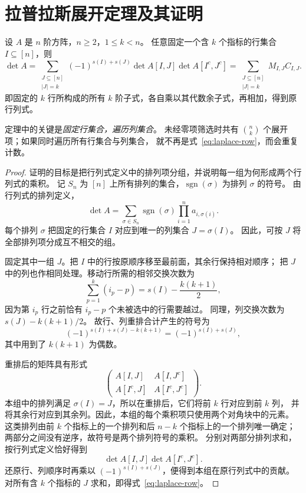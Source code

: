 \documentclass[UTF8,12pt,a4paper,fontset=fandol]{ctexart}
\begin{document}
\section{拉普拉斯展开定理及其证明}

\begin{theorem}[按固定的多行展开]
\label{thm:laplace-row}
设 $A$ 是 $n$ 阶方阵，$n\geq2$，$1\leq k<n$。
任意固定一个含 $k$ 个指标的行集合 $I\subseteq[n]$，则
\begin{equation}
  \det A
  =\sum_{\substack{J\subseteq[n]\\|J|=k}}
  (-1)^{s(I)+s(J)}\det A[I,J]\det A[I^c,J^c]
  =\sum_{\substack{J\subseteq[n]\\|J|=k}}M_{I,J}C_{I,J}.
  \label{eq:laplace-row}
\end{equation}
即固定的 $k$ 行所构成的所有 $k$ 阶子式，各自乘以其代数余子式，再相加，得到原行列式。
\end{theorem}

定理中的关键是\emph{固定行集合，遍历列集合}。
未经零项筛选时共有 $\binom nk$ 个展开项；如果同时遍历所有行集合与列集合，
就不再是式~\eqref{eq:laplace-row}，而会重复计数。

\begin{proof}
证明的目标是把行列式定义中的排列项分组，并说明每一组为何形成两个行列式的乘积。
记 $S_n$ 为 $[n]$ 上所有排列的集合，$\operatorname{sgn}(\sigma)$ 为排列 $\sigma$ 的符号。
由行列式的排列定义，
\[
  \det A=\sum_{\sigma\in S_n}\operatorname{sgn}(\sigma)
  \prod_{i=1}^n a_{i,\sigma(i)}.
\]
每个排列 $\sigma$ 把固定的行集合 $I$ 对应到唯一的列集合 $J=\sigma(I)$。
因此，可按 $J$ 将全部排列项分成互不相交的组。

固定其中一组 $J$。把 $I$ 中的行按原顺序移至最前面，其余行保持相对顺序；
把 $J$ 中的列也作相同处理。移动行所需的相邻交换次数为
\[
  \sum_{p=1}^k(i_p-p)=s(I)-\frac{k(k+1)}2,
\]
因为第 $i_p$ 行之前恰有 $i_p-p$ 个未被选中的行需要越过。
同理，列交换次数为 $s(J)-k(k+1)/2$。
故行、列重排合计产生的符号为
\[
  (-1)^{s(I)+s(J)-k(k+1)}=(-1)^{s(I)+s(J)},
\]
其中用到了 $k(k+1)$ 为偶数。

重排后的矩阵具有形式
\[
  \begin{pmatrix}
    A[I,J]&A[I,J^c]\\
    A[I^c,J]&A[I^c,J^c]
  \end{pmatrix}.
\]
本组中的排列满足 $\sigma(I)=J$，所以在重排后，它们将前 $k$ 行对应到前 $k$ 列，
并将其余行对应到其余列。因此，本组的每个乘积项只使用两个对角块中的元素。
这类排列由前 $k$ 个指标上的一个排列和后 $n-k$ 个指标上的一个排列唯一确定；
两部分之间没有逆序，故符号是两个排列符号的乘积。
分别对两部分排列求和，按行列式定义恰好得到
\[
  \det A[I,J]\det A[I^c,J^c].
\]
还原行、列顺序时再乘以 $(-1)^{s(I)+s(J)}$，便得到本组在原行列式中的贡献。
对所有含 $k$ 个指标的 $J$ 求和，即得式~\eqref{eq:laplace-row}。
\end{proof}
\end{document}
